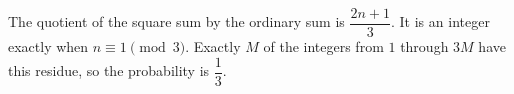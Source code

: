 The quotient of the square sum by the ordinary sum is $\dfrac{2n+1}{3}$. It is an integer exactly when $n\equiv1\pmod3$. Exactly $M$ of the integers from $1$ through $3M$ have this residue, so the probability is $\boxed{\dfrac{1}{3}}$.
